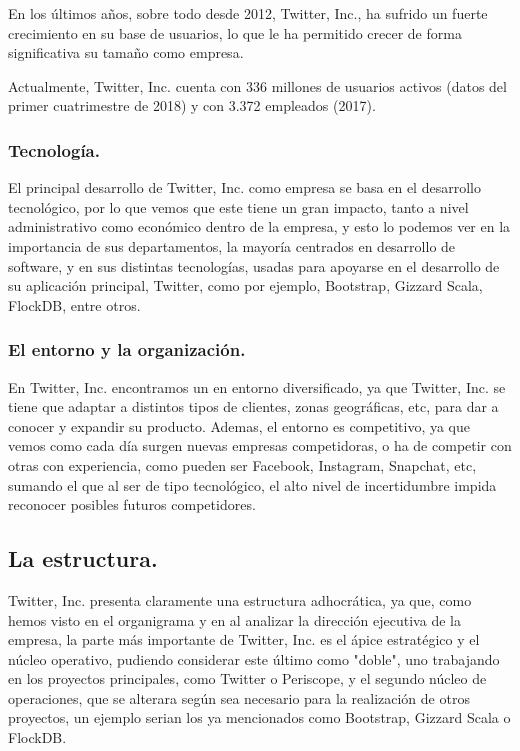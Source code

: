 En los últimos años, sobre todo desde 2012, Twitter, Inc., ha sufrido un fuerte crecimiento en su base de usuarios, lo que le ha permitido crecer de forma significativa su tamaño como empresa.

Actualmente, Twitter, Inc. cuenta con 336 millones de usuarios activos (datos del primer cuatrimestre de 2018) y con 3.372 empleados (2017).

\subsubsection{Tecnología.}

El principal desarrollo de Twitter, Inc. como empresa se basa en el desarrollo tecnológico, por lo que vemos que este tiene un gran impacto, tanto a nivel administrativo como económico dentro de la empresa, y esto lo podemos ver en la importancia de sus departamentos, la mayoría centrados en desarrollo de software, y en sus distintas tecnologías, usadas para apoyarse en el desarrollo de su aplicación principal, Twitter, como por ejemplo, Bootstrap, Gizzard Scala, FlockDB, entre otros.


\subsubsection{El entorno y la organización.}

En Twitter, Inc. encontramos un en entorno diversificado, ya que Twitter, Inc. se tiene que adaptar a distintos tipos de clientes, zonas geográficas, etc, para dar a conocer y expandir su producto. Ademas, el entorno es competitivo, ya que vemos como cada día surgen nuevas empresas competidoras, o ha de competir con otras con experiencia, como pueden ser Facebook, Instagram, Snapchat, etc, sumando el que al ser de tipo tecnológico, el alto nivel de incertidumbre impida reconocer posibles futuros competidores.

\subsection{La estructura.}

Twitter, Inc. presenta claramente una estructura adhocrática, ya que, como hemos visto en el organigrama y en al analizar la dirección ejecutiva de la empresa, la parte más importante de Twitter, Inc. es el ápice estratégico y el núcleo operativo, pudiendo considerar este último como "doble", uno trabajando en los proyectos principales, como Twitter o Periscope, y el segundo núcleo de operaciones, que se alterara según sea necesario para la realización de otros proyectos, un ejemplo serian los ya mencionados como Bootstrap, Gizzard Scala o FlockDB.









